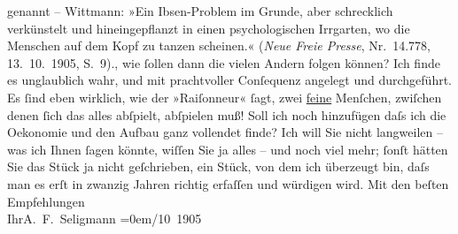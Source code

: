 \begin{ledgroupsized}[t]{13cm}
{{{                  genannt – Wittmann: »Ein Ibsen-Problem im Grunde, aber schrecklich
                     verkünstelt und hineingepflanzt in einen psychologischen Irrgarten, wo die
                     Menschen auf dem Kopf zu tanzen scheinen.« (\emph{Neue Freie Presse}, Nr. 14.778,
                        13. 10. 1905, S. 9).}}}\label{K_L01563-1h}, wie ſollen dann die vielen
               Andern folgen können? Ich finde es unglaublich wahr, und mit prachtvoller Conſequenz
               angelegt und durchgeführt. Es ſind eben wirklich, wie der »Raiſonneur« ſagt, zwei
                  \uline{feine} Menſchen, zwiſchen denen ſich das alles
               abſpielt, abſpielen muß! Soll ich noch hinzufügen daſs ich die Oekonomie und den
               Aufbau ganz vollendet finde? Ich will Sie nicht langweilen – was ich Ihnen ſagen
               könnte, wiſſen Sie {\pb}ja alles – und noch viel mehr; ſonſt hätten Sie das
                  Stück ja nicht geſchrieben,
               ein Stück, von dem ich
               überzeugt bin, daſs man es erſt in zwanzig Jahren richtig erfaſſen und würdigen
               wird.\pend
           \pstart
           Mit den beſten Empfehlungen{\\[\baselineskip]}Ihr\spacefill\mbox{A. F. Seligmann}\pend
           \leftskip=0em{}/10 1905\pend
           
         
         \endnumbering{}\end{ledgroupsized}  \newcommand{\dateiname}{L01563}\newcommand{\titel}{Adalbert Seligmann an Arthur Schnitzler, 13. 10. 1905}\newcommand{\editorInnen}{Martin Anton Müller und Gerd-Hermann Susen}
      